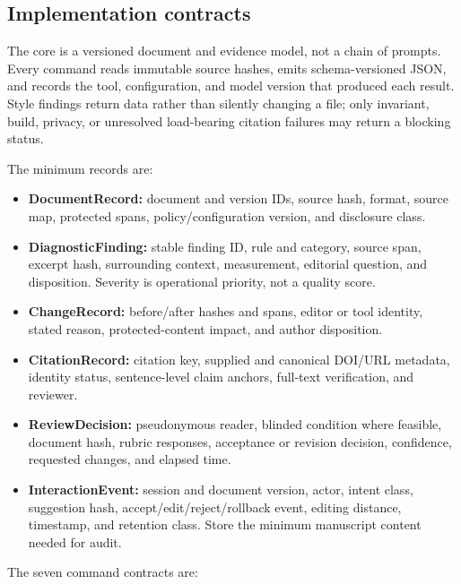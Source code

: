 \documentclass[11pt]{article}
\providecommand{\tightlist}{\setlength{\itemsep}{0pt}\setlength{\parskip}{0pt}}
\begin{document}
\hypertarget{implementation-contracts}{%
\subsection{Implementation contracts}\label{implementation-contracts}}

The core is a versioned document and evidence model, not a chain of prompts. Every command reads immutable source hashes, emits schema-versioned JSON, and records the tool, configuration, and model version that produced each result. Style findings return data rather than silently changing a file; only invariant, build, privacy, or unresolved load-bearing citation failures may return a blocking status.

The minimum records are:

\begin{itemize}
\tightlist
\item
  \textbf{DocumentRecord:} document and version IDs, source hash, format, source map, protected spans, policy/configuration version, and disclosure class.
\item
  \textbf{DiagnosticFinding:} stable finding ID, rule and category, source span, excerpt hash, surrounding context, measurement, editorial question, and disposition. Severity is operational priority, not a quality score.
\item
  \textbf{ChangeRecord:} before/after hashes and spans, editor or tool identity, stated reason, protected-content impact, and author disposition.
\item
  \textbf{CitationRecord:} citation key, supplied and canonical DOI/URL metadata, identity status, sentence-level claim anchors, full-text verification, and reviewer.
\item
  \textbf{ReviewDecision:} pseudonymous reader, blinded condition where feasible, document hash, rubric responses, acceptance or revision decision, confidence, requested changes, and elapsed time.
\item
  \textbf{InteractionEvent:} session and document version, actor, intent class, suggestion hash, accept/edit/reject/rollback event, editing distance, timestamp, and retention class. Store the minimum manuscript content needed for audit.
\end{itemize}

The seven command contracts are:
\end{document}

